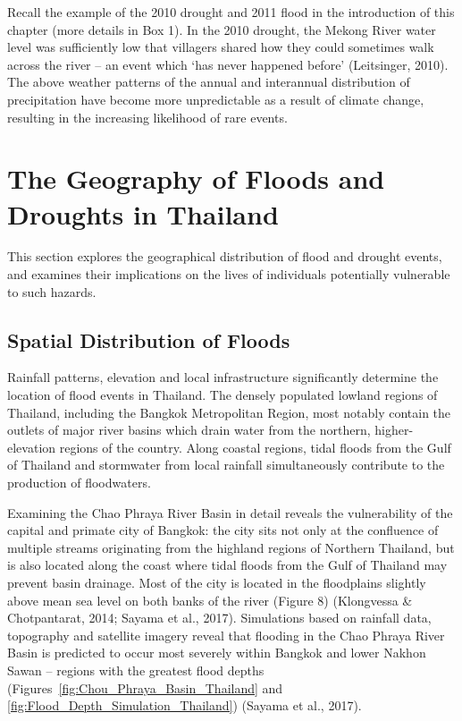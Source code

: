 Recall the example of the 2010 drought and 2011 flood in the introduction of this chapter (more details in Box 1). In the 2010 drought, the Mekong River water level was sufficiently low that villagers shared how they could sometimes walk across the river -- an event which ‘has never happened before' (Leitsinger, 2010). The above weather patterns of the annual and interannual distribution of precipitation have become more unpredictable as a result of climate change, resulting in the increasing likelihood of rare events.


\section{The Geography of Floods and Droughts in Thailand}

This section explores the geographical distribution of flood and drought events, and examines their implications on the lives of individuals potentially vulnerable to such hazards.

\subsection{Spatial Distribution of Floods}

Rainfall patterns, elevation and local infrastructure significantly determine the location of flood events in Thailand. The densely populated lowland regions of Thailand, including the Bangkok Metropolitan Region, most notably contain the outlets of major river basins which drain water from the northern, higher-elevation regions of the country. Along coastal regions, tidal floods from the Gulf of Thailand and stormwater from local rainfall simultaneously contribute to the production of floodwaters.

Examining the Chao Phraya River Basin in detail reveals the vulnerability of the capital and primate city of Bangkok: the city sits not only at the confluence of multiple streams originating from the highland regions of Northern Thailand, but is also located along the coast where tidal floods from the Gulf of Thailand may prevent basin drainage. Most of the city is located in the floodplains slightly above mean sea level on both banks of the river (Figure 8) (Klongvessa \& Chotpantarat, 2014; Sayama et al., 2017). Simulations based on rainfall data, topography and satellite imagery reveal that flooding in the Chao Phraya River Basin is predicted to occur most severely within Bangkok and lower Nakhon Sawan -- regions with the greatest flood depths (Figures~\ref{fig:Chou_Phraya_Basin_Thailand} and \ref{fig:Flood_Depth_Simulation_Thailand}) (Sayama et al., 2017).

